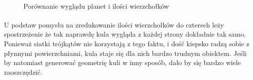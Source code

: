 \begin{figure}
\centering
\label{fig:geom}
	   \hspace{.0\textwidth}
	   \hspace{.0\textwidth}
	   \hspace{.0\textwidth} \\
	 \hspace{.0\textwidth} 
\caption{Porównanie wyglądu planet i ilości wierzchołków}
\end{figure}

\paragraph{}

U podstaw pomysłu na zredukowanie ilości wierzchołków do czterech leży spostrzeżenie że tak naprawdę kula wygląda z każdej strony dokładnie tak samo. Ponieważ siatki trójkątów nie korzystają z tego faktu, i dość kiepsko radzą sobie z płynnymi powierzchniami, kula staje się dla nich bardzo trudnym obiektem. Jeśli by natomiast generować geometrię kuli w inny sposób, dało by się bardzo wiele zaoszczędzić.


